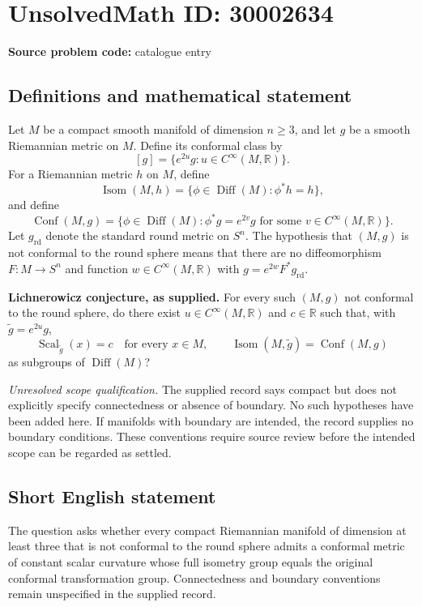 \documentclass[11pt]{article}
\newcommand{\R}{\mathbb{R}}
\begin{document}
\section*{UnsolvedMath ID: 30002634}
\textbf{Source problem code:} catalogue entry
\subsection{Definitions and mathematical statement}
Let \(M\) be a compact smooth manifold of dimension \(n\geq 3\), and let \(g\) be a smooth Riemannian metric on \(M\). Define its conformal class by
\[
[g]=\{e^{2u}g:u\in C^\infty(M,\R)\}.
\]
For a Riemannian metric \(h\) on \(M\), define
\[
\operatorname{Isom}(M,h)=\{\phi\in\operatorname{Diff}(M):\phi^*h=h\},
\]
and define
\[
\operatorname{Conf}(M,g)=\{\phi\in\operatorname{Diff}(M):\phi^*g=e^{2v}g\text{ for some }v\in C^\infty(M,\R)\}.
\]
Let \(g_{\mathrm{rd}}\) denote the standard round metric on \(S^n\). The hypothesis that \((M,g)\) is not conformal to the round sphere means that there are no diffeomorphism \(F:M\to S^n\) and function \(w\in C^\infty(M,\R)\) with \(g=e^{2w}F^*g_{\mathrm{rd}}\).

\textbf{Lichnerowicz conjecture, as supplied.} For every such \((M,g)\) not conformal to the round sphere, do there exist \(u\in C^\infty(M,\R)\) and \(c\in\R\) such that, with \(\widetilde g=e^{2u}g\),
\[
\operatorname{Scal}_{\widetilde g}(x)=c\quad\text{for every }x\in M,
\qquad
\operatorname{Isom}(M,\widetilde g)=\operatorname{Conf}(M,g)
\]
as subgroups of \(\operatorname{Diff}(M)\)?

\textit{Unresolved scope qualification.} The supplied record says compact but does not explicitly specify connectedness or absence of boundary. No such hypotheses have been added here. If manifolds with boundary are intended, the record supplies no boundary conditions. These conventions require source review before the intended scope can be regarded as settled.
\subsection{Short English statement}
The question asks whether every compact Riemannian manifold of dimension at least three that is not conformal to the round sphere admits a conformal metric of constant scalar curvature whose full isometry group equals the original conformal transformation group. Connectedness and boundary conventions remain unspecified in the supplied record.
\end{document}
